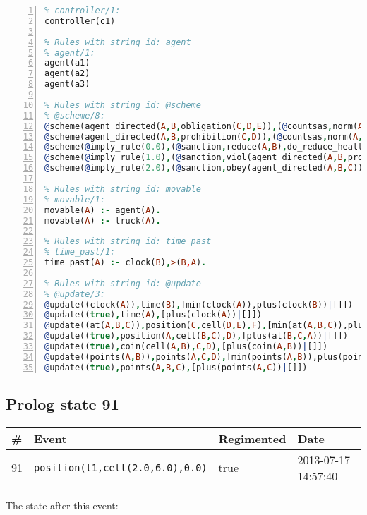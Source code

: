 \documentclass[11pt]{article}\usepackage[utf8]{inputenc}\usepackage{geometry}
\begin{document}
\begin{lstlisting}[language=Prolog, numbers=left]
% Rules with string id: controller
% controller/1:
controller(c1)

% Rules with string id: agent
% agent/1:
agent(a1)
agent(a2)
agent(a3)

% Rules with string id: @scheme
% @scheme/8:
@scheme(agent_directed(A,B,obligation(C,D,E)),(@countsas,norm(A,B,F,obligation(C,D,E)),F),false,(listTrue(C)),(time_past(D)),false,[plus(viol(agent_directed(A,B,obligation(C,D,E))))|[]],[plus(obey(agent_directed(A,B,obligation(C,D,E))))|[]])
@scheme(agent_directed(A,B,prohibition(C,D)),(@countsas,norm(A,B,E,prohibition(C,D)),E),(listTrue(C)),false,(false),false,[plus(viol(agent_directed(A,B,prohibition(C,D))))|[]],[plus(obey(agent_directed(A,B,prohibition(C,D))))|[]])
@scheme(@imply_rule(0.0),(@sanction,reduce(A,B),do_reduce_health(A,B),notifyAgent(A,changed(status))),true,false,false,false,[min(reduce(A,B))|[]],[])
@scheme(@imply_rule(1.0),(@sanction,viol(agent_directed(A,B,prohibition(C,D))),do_sanction(D)),true,false,false,false,[min(viol(agent_directed(A,B,prohibition(C,D))))|[]],[])
@scheme(@imply_rule(2.0),(@sanction,obey(agent_directed(A,B,C))),true,false,false,false,[min(obey(agent_directed(A,B,C)))|[]],[])

% Rules with string id: movable
% movable/1:
movable(A) :- agent(A).
movable(A) :- truck(A).

% Rules with string id: time_past
% time_past/1:
time_past(A) :- clock(B),>(B,A).

% Rules with string id: @update
% @update/3:
@update((clock(A)),time(B),[min(clock(A)),plus(clock(B))|[]])
@update((true),time(A),[plus(clock(A))|[]])
@update((at(A,B,C)),position(C,cell(D,E),F),[min(at(A,B,C)),plus(at(D,E,C))|[]])
@update((true),position(A,cell(B,C),D),[plus(at(B,C,A))|[]])
@update((true),coin(cell(A,B),C,D),[plus(coin(A,B))|[]])
@update((points(A,B)),points(A,C,D),[min(points(A,B)),plus(points(A,D))|[]])
@update((true),points(A,B,C),[plus(points(A,C))|[]])

\end{lstlisting}
\clearpage 
\subsection{Prolog state 91}
\begin{table}[ht]
\centering 
\begin{tabular}{l l l l} 
\textbf{\#} & \textbf{Event} & \textbf{Regimented} & \textbf{Date} \\ [0.5ex] 
\hline
91&\texttt{position(t1,cell(2.0,6.0),0.0)}&true&2013-07-17 14:57:40\\ [1ex] \hline\end{tabular}
\end{table}
The state after this event:
\end{document}
